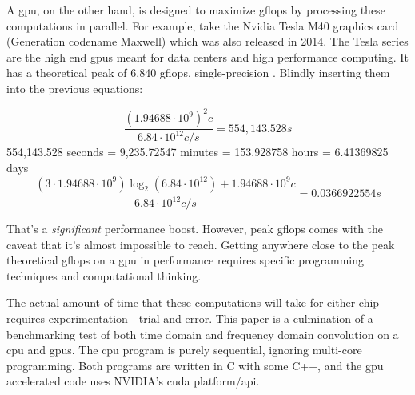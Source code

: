 A \gls{gpu}, on the other hand, is designed to maximize \gls{gflops} by processing these computations in parallel. For example, take the Nvidia Tesla M40 graphics card (Generation codename Maxwell) which was also released in 2014. The Tesla series are the high end \glspl{gpu} meant for data centers and high performance computing. It has a theoretical peak of 6,840 \gls{gflops}, single-precision \citep{teslagp100}. Blindly inserting them into the previous equations:

$$\frac{(1.94688 \cdot 10^9)^2 c}{6.84 \cdot 10^12  c/s} = 554,143.528 s$$
554,143.528 seconds = 9,235.72547 minutes = 153.928758 hours = 6.41369825 days
$$\frac{(3 \cdot 1.94688 \cdot 10^9)\log_2(6.84 \cdot 10^12) + 1.94688 \cdot 10^9 c}{6.84 \cdot 10^12  c/s} = 0.0366922554 s$$

That's a \textit{significant} performance boost. However, peak \gls{gflops} comes with the caveat that it's almost impossible to reach. Getting anywhere close to the peak theoretical \gls{gflops} on a \gls{gpu} in performance requires specific programming techniques and computational thinking. 

The actual amount of time that these computations will take for either chip requires experimentation - trial and error. This paper is a culmination of a benchmarking test of both time domain and frequency domain convolution on a \gls{cpu} and \glspl{gpu}. The \gls{cpu} program is purely sequential, ignoring multi-core programming. Both programs are written in C with some C++, and the \gls{gpu} accelerated code uses NVIDIA's \gls{cuda} platform/\gls{api}.